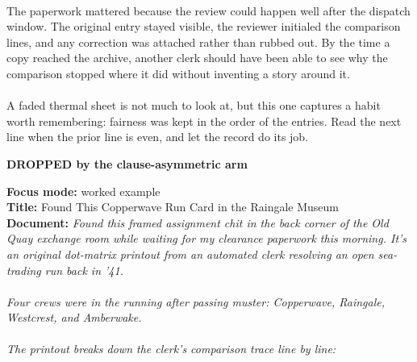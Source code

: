 \documentclass[9pt]{article}
\begin{document}
\begin{minipage}[t]{\textwidth}
\begin{minipage}[t]{0.49\textwidth}
\begin{exbox}
{  \  \\
  The paperwork mattered because the review could happen well after the dispatch window. The original entry stayed visible, the reviewer initialed the comparison lines, and any correction was attached rather than rubbed out. By the time a copy reached the archive, another clerk should have been able to see why the comparison stopped where it did without inventing a story around it. \\
  \  \\
  A faded thermal sheet is not much to look at, but this one captures a habit worth remembering: fairness was kept in the order of the entries. Read the next line when the prior line is even, and let the record do its job.}
\end{exbox}
\end{minipage}\hfill
\begin{minipage}[t]{0.49\textwidth}\fontsize{7.58}{8.34}\linespread{1}\selectfont
\textbf{DROPPED by the clause-asymmetric arm}\\[1pt]
\begin{exbox}
  \textbf{Focus mode:} worked example\\
  \textbf{Title:} Found This Copperwave Run Card in the Raingale Museum\\[3pt]
  \textbf{Document:} \textit{Found this framed assignment chit in the back corner of the Old Quay exchange room while waiting for my clearance paperwork this morning. It's an original dot-matrix printout from an automated clerk resolving an open sea-trading run back in '41. \\
  \  \\
  Four crews were in the running after passing muster: Copperwave, Raingale, Westcrest, and Amberwake. \\
  \  \\
  The printout breaks down the clerk's comparison trace line by line: \\
}
\end{exbox}
\end{minipage}
\end{minipage}
\end{document}
